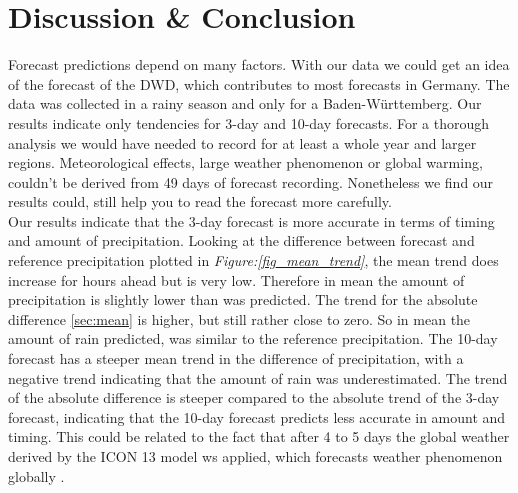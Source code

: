\documentclass{article}
\theoremstyle{plain}
\theoremstyle{definition}
\theoremstyle{remark}
\begin{document}
\section{Discussion \& Conclusion}\label{sec:conclusion}
Forecast predictions depend on many factors. With our data we could get an idea
of the forecast of the DWD, which contributes to most forecasts in Germany.
The data was collected in a rainy season and only for a Baden-Württemberg.
Our results indicate only tendencies for 3-day and 10-day forecasts. For a
thorough analysis we would have needed to record for at least a whole year and
larger regions. Meteorological effects, large weather phenomenon or global
warming, couldn't be derived from 49 days of forecast recording.
Nonetheless we find our results could, still help you to read the forecast more
carefully.\\ %
Our results indicate that the 3-day forecast is more accurate in terms of
timing and amount of precipitation.  %
Looking at the difference between forecast and reference precipitation plotted
in \textit{Figure:\ref{fig_mean_trend}}, the mean trend does increase for hours
ahead but is very low.	%
Therefore in mean the amount of precipitation is slightly lower than was
predicted. The trend for the absolute difference \ref{sec:mean} is higher, but
still rather close to zero. %
So in mean the amount of rain predicted, was %
similar to the reference precipitation. The 10-day forecast has a steeper mean
trend in the difference of precipitation, with a negative trend indicating that
the amount of rain was underestimated. The trend of the absolute difference is
steeper compared to the absolute trend of the 3-day forecast, indicating that
the 10-day forecast predicts less accurate in amount and timing. This could be
related to the fact that after 4 to 5 days the global weather derived by the
ICON 13 model ws applied, which forecasts weather phenomenon globally
\cite{https://www.dwd.de/EN/research/weatherforecasting/num_modelling/01_num_weather_prediction_modells/num_weather_prediction_models_node.html;jsessionid=786E9AB9443F03FDD4DC115782E1BC94.live21064}.\\
\end{document}
